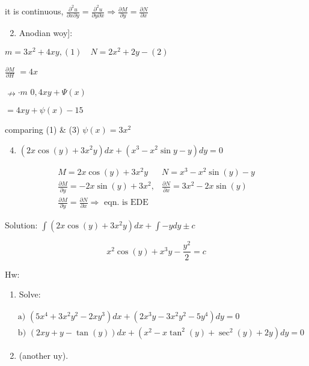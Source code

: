 \documentclass[12pt, a4paper]{article}
\begin{document}
it is continuous, $\frac{\partial^{2} u}{\partial x \partial y}=\frac{\partial^{2} u}{\partial y \partial x} \Rightarrow \frac{\partial M}{\partial y}=\frac{\partial N}{\partial x}$

\begin{enumerate}
  \setcounter{enumi}{1}
  \item Anodian woy]:
\end{enumerate}

$m=3 x^{2}+4 x y,(1) \quad N=2 x^{2}+2 y-(2)$

$\frac{\partial M}{\partial H}$ $=4 x$

$\nrightarrow \cdot m$ $0,4 x y+\Psi(x)$

$=4 x y+\psi(x)-15$

comparing (1) \& (3) $\psi(x)=3 x^{2}$

\begin{enumerate}
  \setcounter{enumi}{3}
  \item $\left(2 x \cos (y)+3 x^{2} y\right) d x+\left(x^{3}-x^{2} \sin y-y\right) d y=0$
\end{enumerate}

$$
\begin{array}{ll}
M=2 x \cos (y)+3 x^{2} y & N=x^{3}-x^{2} \sin (y)-y \\
\frac{\partial M}{\partial y}=-2 x \sin (y)+3 x^{2}, & \frac{\partial N}{\partial x}=3 x^{2}-2 x \sin (y) \\
\frac{\partial M}{\partial y}=\frac{\partial N}{\partial x} \Rightarrow \text { eqn. is EDE }
\end{array}
$$

Solution: $\int\left(2 x \cos (y)+3 x^{2} y\right) d x+\int-y d y \pm c$

$$
x^{2} \cos (y)+x^{3} y-\frac{y^{2}}{2}=c
$$

Hw:

\begin{enumerate}
  \item Solve:
\end{enumerate}

$$
\begin{aligned}
& \text { a) }\left(5 x^{4}+3 x^{2} y^{2}-2 x y^{3}\right) d x+\left(2 x^{3} y-3 x^{2} y^{2}-5 y^{4}\right) d y=0 \\
& \text { b) }(2 x y+y-\tan (y)) d x+\left(x^{2}-x \tan ^{2}(y)+\sec ^{2}(y)+2 y\right) d y=0
\end{aligned}
$$

\begin{enumerate}
  \setcounter{enumi}{1}
  \item (another uy).
\end{enumerate}
\end{document}
